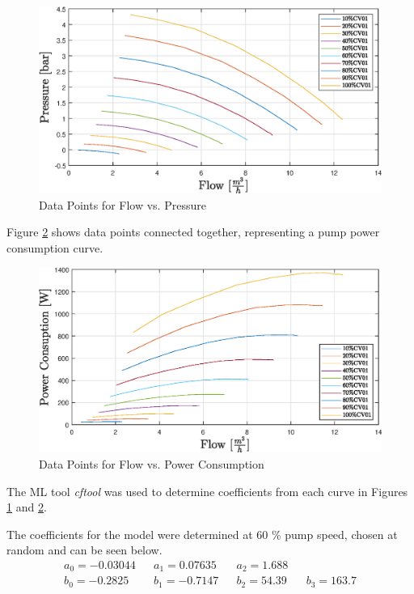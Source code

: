 {\begin{figure}[h]
	\centering
	\includegraphics[width=1\textwidth]{figures/05mathematicalModelling/flowVsPressureRun34.eps}
	\caption{Data Points for Flow vs. Pressure}
	\label{fig:flowVsPressure}
\end{figure}

\newpage
Figure \ref{fig:flowVsPowerConsumption} shows data points connected together, representing a pump
power consumption curve.

\begin{figure}[ht]
	\centering
	\includegraphics[width=1\textwidth]{figures/05mathematicalModelling/flowVsPowerRun34.eps}
	\caption{Data Points for Flow vs. Power Consumption}
	\label{fig:flowVsPowerConsumption}
\end{figure}

The ML tool \textit{cftool} was used to determine coefficients  from each curve in  Figures \ref{fig:flowVsPressure} and \ref{fig:flowVsPowerConsumption}.

The coefficients for the model were determined at 60 \% pump speed, chosen at random and can be seen below.
\begin{align*}
	a_0 = -0.03044 && a_1 = 0.07635  && a_2 = 1.688  \\
	b_0 = -0.2825 && b_1 = -0.7147 && b_2 = 54.39 && b_3 = 163.7 \\
\end{align*}
\newpage
}

